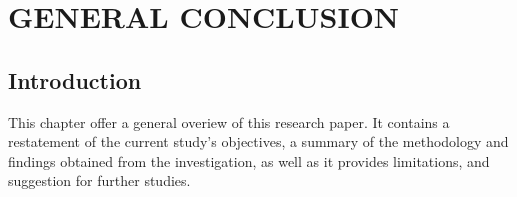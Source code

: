\chapter{GENERAL CONCLUSION}
\section{Introduction}
This chapter offer a general overiew of this research paper.
It contains a restatement of the current study's objectives, a summary of 
the methodology and findings obtained from the investigation, as well as it provides
limitations, and suggestion for further studies.
